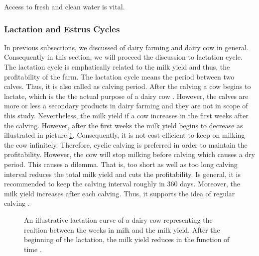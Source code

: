 \documentclass[english,12pt,a4paper,pdftex,elec,utf8]{aaltothesis}
\begin{document}
 Access to fresh and clean water is vital. \cite{luomuopas} 



\subsubsection{Lactation and Estrus Cycles} \label{lactationandestruscyclessection}

In previous subsections, we discussed of dairy farming and dairy cow in general. Consequently in this section, we will proceed the discussion to lactation cycle. The lactation cycle is emphatically related to the milk yield and thus, the profitability of the farm. The lactation cycle means the period between two calves. Thus, it is also called as calving period. After the calving a cow begins to lactate, which is the the actual purpose of a dairy cow \cite{lehmahavaintoja}. However, the calves are more or less a secondary products in dairy farming and they are not in scope of this study. Nevertheless, the milk yield if a cow increases in the first weeks after the calving. However, after the first weeks the milk yield begins to decrease as illustrated in picture \ref{lactationapproximation}. Consequently, it is not cost-efficient to keep on milking the cow infinitely. Therefore, cyclic calving is preferred in order to maintain the profitability. However, the cow will stop milking before calving which causes a dry period. This causes a dilemma. That is, too short as well as too long calving interval reduces the total milk yield and cuts the profitability. Is general, it is recommended to keep the calving interval roughly in 360 days. Moreover, the milk yield increases after each calving. Thus, it supports the idea of regular calving \cite{lehmientuotoskasvaa}.

 \begin{figure}
 \centering
    \caption{An illustrative lactation curve of a dairy cow representing the realtion between the weeks in milk and the milk yield. After the beginning of the lactation, the milk yield reduces in the function of time \cite{lactationcurve}.} \label{lactationapproximation}
 \end{figure}
\end{document}
